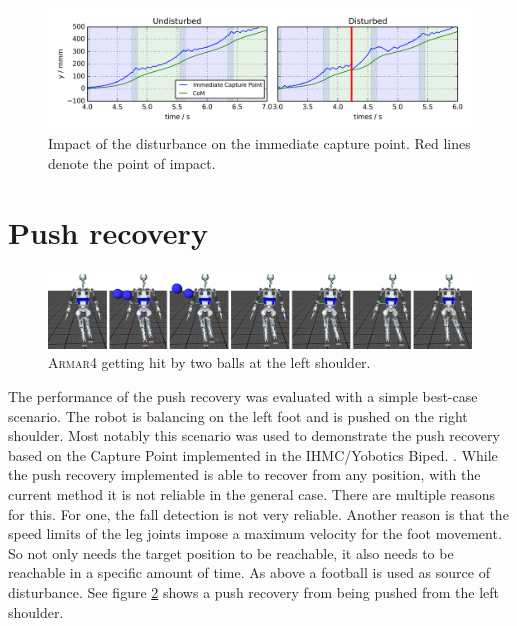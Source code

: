 \documentclass[english,ngerman]{KITreprt}
\newcommand{\name}[1]{\textsc{#1}}
\begin{document}
\begin{figure}[hbt]
\vspace*{-1em}
\includegraphics[width=\textwidth,resolution=300]{images/cp_disturbance_front_y.png}
\caption{Impact of the disturbance on the immediate capture point. Red lines denote the point of impact.}
\label{img:cp-disturbance-front-y}
\end{figure}

\section{Push recovery}\label{push-recovery-1}

\begin{figure}[hbt]
\vspace*{-1em}
\includegraphics[width=\textwidth,resolution=300]{images/push_recovery_thumbs.png}
\caption{\name{Armar4} getting hit by two balls at the left shoulder.}
\label{img:push-recovery-thumbs}
\end{figure}

The performance of the push recovery was evaluated with a simple
best-case scenario. The robot is balancing on the left foot and is
pushed on the right shoulder. Most notably this scenario was used to
demonstrate the push recovery based on the Capture Point implemented in
the IHMC/Yobotics Biped. \cite{pratt2009video}. While the push recovery
implemented is able to recover from any position, with the current
method it is not reliable in the general case. There are multiple
reasons for this. For one, the fall detection is not very reliable.
Another reason is that the speed limits of the leg joints impose a
maximum velocity for the foot movement. So not only needs the target
position to be reachable, it also needs to be reachable in a specific
amount of time. As above a football is used as source of disturbance.
See figure \ref{img:push-recovery-thumbs} shows a push recovery from
being pushed from the left shoulder.
\end{document}
